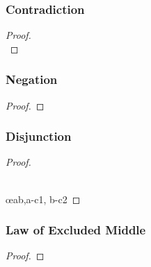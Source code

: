 \begin{multicols}{2}
%
%


\subsubsection*{Contradiction}

\begin{proof}

\\
\end{proof}


\subsubsection*{Negation}
\begin{proof}
\open
	\ellipsesline
\close
{}
\end{proof}



\subsubsection*{Disjunction}

\begin{proof}

\\	

\\	\open
		\ellipsesline
	\close
	\open
		\ellipsesline
	\close
	 \oe{ab,a-c1, b-c2}
\end{proof}

\subsubsection*{Law of Excluded Middle}
\begin{proof}
	\LEM
\end{proof}


\end{multicols}

